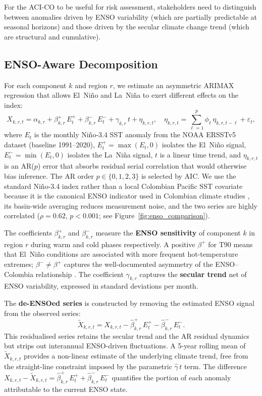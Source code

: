 \documentclass[12pt]{article}
\begin{document}
For the ACI-CO to be useful for risk assessment, stakeholders need to distinguish between anomalies driven by ENSO variability (which are partially predictable at seasonal horizons) and those driven by the secular climate change trend (which are structural and cumulative).

\subsection{ENSO-Aware Decomposition}

For each component $k$ and region $r$, we estimate an asymmetric ARIMAX regression that allows El~Ni\~no and La~Ni\~na to exert different effects on the index:
\begin{equation}\label{eq:enso_regression}
X_{k,r,t} = \alpha_{k,r} + \beta^+_{k,r}\,E^+_t + \beta^-_{k,r}\,E^-_t + \gamma_{k,r}\,t + \eta_{k,r,t}, \quad \eta_{k,r,t} = \sum_{\ell=1}^{p}\phi_\ell\,\eta_{k,r,t-\ell} + \varepsilon_t,
\end{equation}
where $E_t$ is the monthly Ni\~no-3.4 SST anomaly from the NOAA ERSSTv5 dataset (baseline 1991--2020), $E^+_t = \max(E_t,0)$ isolates the El~Ni\~no signal, $E^-_t = \min(E_t,0)$ isolates the La~Ni\~na signal, $t$ is a linear time trend, and $\eta_{k,r,t}$ is an AR($p$) error that absorbs residual serial correlation that would otherwise bias inference. The AR order $p\in\{0,1,2,3\}$ is selected by AIC. We use the standard Ni\~no-3.4 index rather than a local Colombian Pacific SST covariate because it is the canonical ENSO indicator used in Colombian climate studies \citep{poveda2011,morales2021wavelet}, its basin-wide averaging reduces measurement noise, and the two series are highly correlated ($\rho=0.62$, $p<0.001$; see Figure~\ref{fig:enso_comparison}).

The coefficients $\beta^+_{k,r}$ and $\beta^-_{k,r}$ measure the \textbf{ENSO sensitivity} of component $k$ in region $r$ during warm and cold phases respectively. A positive $\beta^+$ for T90 means that El~Ni\~no conditions are associated with more frequent hot-temperature extremes; $\beta^- \neq \beta^+$ captures the well-documented asymmetry of the ENSO--Colombia relationship \citep{morales2021wavelet}. The coefficient $\gamma_{k,r}$ captures the \textbf{secular trend} net of ENSO variability, expressed in standard deviations per month.

The \textbf{de-ENSOed series} is constructed by removing the estimated ENSO signal from the observed series:
\begin{equation}
\tilde{X}_{k,r,t} = X_{k,r,t} - \hat{\beta}^+_{k,r}\,E^+_t - \hat{\beta}^-_{k,r}\,E^-_t.
\end{equation}
This residualised series retains the secular trend and the AR residual dynamics but strips out interannual ENSO-driven fluctuations. A 5-year rolling mean of $\tilde{X}_{k,r,t}$ provides a non-linear estimate of the underlying climate trend, free from the straight-line constraint imposed by the parametric $\hat{\gamma}\,t$ term. The difference $X_{k,r,t} - \tilde{X}_{k,r,t} = \hat{\beta}^+_{k,r}\,E^+_t + \hat{\beta}^-_{k,r}\,E^-_t$ quantifies the portion of each anomaly attributable to the current ENSO state.
\end{document}
